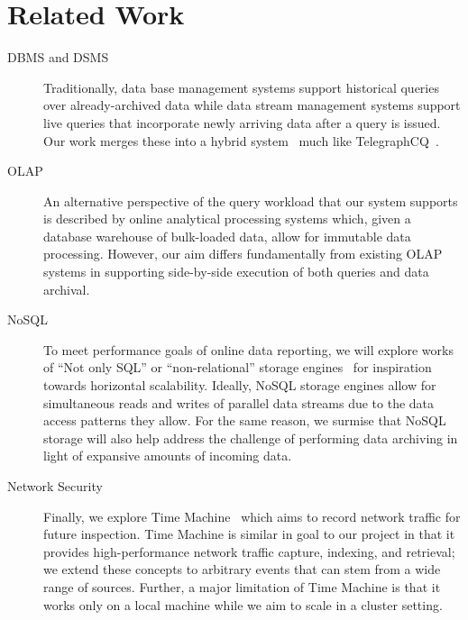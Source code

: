 \documentclass[11pt]{article}
\begin{document}
\section{Related Work}

%
%
\begin{description}
\item[DBMS and DSMS]
Traditionally, data base management systems support historical queries over
already-archived data while data stream management systems support live queries
that incorporate newly arriving data after a query is issued. Our work merges these
into a hybrid system~\cite{Reiss07} much like TelegraphCQ~\cite{Chandrasekaran03}.

\item[OLAP]
An alternative perspective of the query workload that our system supports is
described by online analytical processing systems which, given a database
warehouse of bulk-loaded data, allow for immutable data processing. However, our
aim differs fundamentally from existing OLAP systems in supporting side-by-side
execution of both queries and data archival.

\item[NoSQL]
To meet performance goals of online data reporting, we will explore works of
``Not only SQL'' or ``non-relational'' storage engines~\cite{Cattell10} for
inspiration towards horizontal scalability. Ideally, NoSQL storage engines
allow for simultaneous reads and writes of parallel data streams due to the
data access patterns they allow. For the same reason, we surmise that NoSQL
storage will also help address the challenge of performing data archiving in
light of expansive amounts of incoming data.

\item[Network Security]
Finally, we explore Time Machine~\cite{Maier08} which aims to record network
traffic for future inspection. Time Machine is similar in goal to our project
in that it provides high-performance network traffic capture, indexing, and
retrieval; we extend these concepts to arbitrary events that can stem from a wide
range of sources. Further, a major limitation of Time Machine is that it works
only on a local machine while we aim to scale in a cluster setting.

\end{description}



\end{document}
